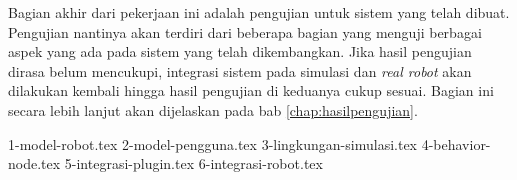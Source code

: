 Bagian akhir dari pekerjaan ini adalah pengujian untuk sistem yang telah dibuat.
Pengujian nantinya akan terdiri dari beberapa bagian yang menguji berbagai aspek yang ada pada sistem yang telah dikembangkan.
Jika hasil pengujian dirasa belum mencukupi, integrasi sistem pada simulasi dan \emph{real robot} akan dilakukan kembali hingga hasil pengujian di keduanya cukup sesuai.
Bagian ini secara lebih lanjut akan dijelaskan pada bab \ref{chap:hasilpengujian}.

{1-model-robot.tex}
{2-model-pengguna.tex}
{3-lingkungan-simulasi.tex}
{4-behavior-node.tex}
{5-integrasi-plugin.tex}
{6-integrasi-robot.tex}

